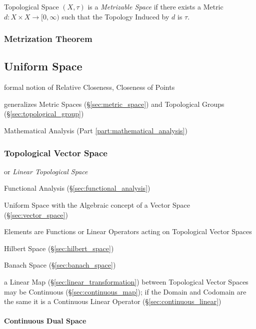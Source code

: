 Topological Space $(X, \tau)$ is a \emph{Metrizable Space} if there
exists a Metric $d : X \times X \rightarrow [0, \infty)$ such that the
  Topology Induced by $d$ is $\tau$.



\subsubsection{Metrization Theorem}\label{sec:metrization_theorem}



\subsection{Uniform Space}\label{sec:uniform_space}

formal notion of Relative Closeness, Closeness of Points

generalizes Metric Spaces (\S\ref{sec:metric_space}) and Topological
Groups (\S\ref{sec:topological_group})

Mathematical Analysis (Part \ref{part:mathematical_analysis})



\subsubsection{Topological Vector Space}\label{sec:topological_vectorspace}

or \emph{Linear Topological Space}

Functional Analysis (\S\ref{sec:functional_analysis})

Uniform Space with the Algebraic concept of a Vector Space
(\S\ref{sec:vector_space})

Elements are Functions or Linear Operators acting on Topological
Vector Spaces

Hilbert Space (\S\ref{sec:hilbert_space})

Banach Space (\S\ref{sec:banach_space})

a Linear Map (\S\ref{sec:linear_transformation}) between Topological Vector
Spaces may be Continuous (\S\ref{sec:continuous_map}); if the Domain
and Codomain are the same it is a Continuous Linear Operator
(\S\ref{sec:continuous_linear})



\paragraph{Continuous Dual Space}\label{sec:continuous_dual_space}
\hfill

